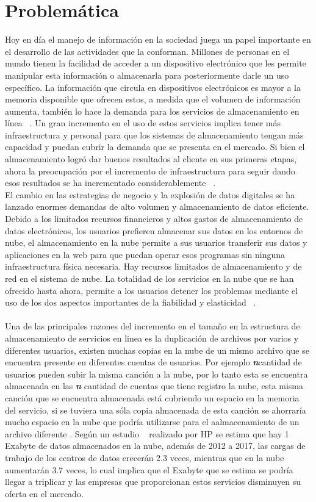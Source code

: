 \section{Problemática}
Hoy en día el manejo de información en la sociedad juega un papel importante en el desarrollo de las actividades que la conforman. Millones de personas en el mundo tienen la facilidad de acceder a un dispositivo electrónico que les permite manipular esta información o almacenarla para posteriormente darle un uso específico. La información que circula en dispositivos electrónicos es mayor a la memoria disponible que ofrecen estos, a medida que el volumen de información aumenta, también lo hace la demanda para los servicios de almacenamiento en línea ~\cite{Bellare}. Un gran incremento en el uso de estos servicios implica tener más infraestructura y personal para que los sistemas de almacenamiento tengan más capacidad y puedan cubrir la demanda que se presenta en el mercado. Si bien el almacenamiento logró dar buenos resultados al cliente en sus primeras etapas, ahora la preocupación por el incremento de infraestructura para seguir dando esos resultados se ha incrementado considerablemente  ~\cite{Keelveedhi}.
\\
El cambio en las estrategias de negocio y la explosión de datos digitales se ha lanzado enormes demandas de alto volumen y almacenamiento de datos eficiente. Debido a los limitados recursos financieros y altos gastos de almacenamiento de datos electrónicos, los usuarios prefieren almacenar sus datos en los entornos de nube, el almacenamiento en la nube permite a sus usuarios transferir sus datos y aplicaciones en la web para que puedan operar esos programas sin ninguna infraestructura física necesaria. Hay recursos limitados de almacenamiento y de red en el sistema de nube. La totalidad de los servicios en la nube que se han ofrecido hasta ahora, permite a los usuarios detener los problemas mediante el uso de los dos aspectos importantes de la fiabilidad y elasticidad ~\cite{Keelveedhi}.
\\ \\
Una de las principales razones del incremento en el tamaño en la estructura de almacenamiento de servicios en linea es la duplicación de archivos por varios y diferentes usuarios, existen muchas copias en la nube de un mismo archivo que se encuentra presente en diferentes cuentas de usuarios. Por ejemplo \textbf{\textit{n}}cantidad de  usuarios pueden subir la misma canción a la nube, por lo tanto esta se encuentra almacenada en las \textbf{\textit{n}} cantidad de cuentas que tiene registro la nube, esta misma canción que se encuentra almacenada está cubriendo un espacio en la memoria del servicio, si se tuviera una sóla copia almacenada de esta canción se ahorraría mucho espacio en la nube que podría utilizarse para el aalmacenamiento de un archivo diferente . Según un estudio ~\cite{popa} realizado por HP se estima que hay 1 Exabyte de datos almacenados en la nube, además de 2012 a 2017, las cargas de trabajo de los centros de datos crecerán 2.3 veces, mientras que en la nube aumentarán 3.7 veces, lo cual implica que el Exabyte que se estima se podría llegar a triplicar y las empresas que proporcionan estos servicios disminuyen su oferta en el mercado. 

